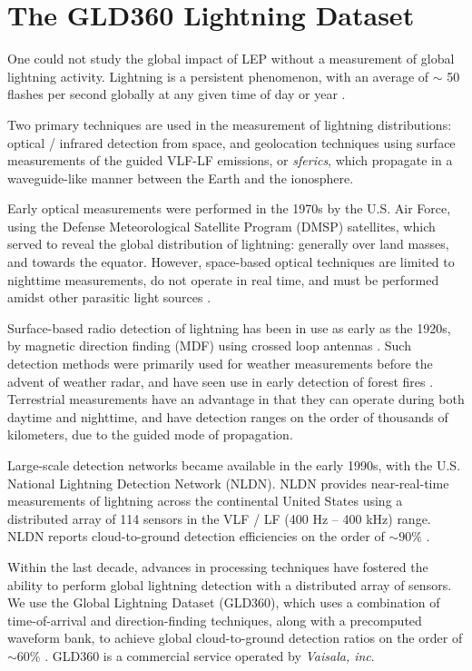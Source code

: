 \section{The GLD360 Lightning Dataset}
One could not study the global impact of LEP without a measurement of global lightning activity. Lightning is a persistent phenomenon, with an average of $\sim$ 50 flashes per second globally at any given time of day or year \citep{Brooks1925, Orville1979}.

Two primary techniques are used in the measurement of lightning distributions: optical / infrared detection from space, and geolocation techniques using surface measurements of the guided VLF-LF emissions, or \emph{sferics}, which propagate in a waveguide-like manner between the Earth and the ionosphere. 

Early optical measurements were performed in the 1970s by the U.S. Air Force, using the Defense Meteorological Satellite Program (DMSP) satellites, which served to reveal the global distribution of lightning: generally over land masses, and towards the equator. However, space-based optical techniques are limited to nighttime measurements, do not operate in real time, and must be performed amidst other parasitic light sources \citep{Orville1995}.

Surface-based radio detection of lightning has been in use as early as the 1920s, by magnetic direction finding (MDF) using crossed loop antennas \citep{Horner1954, Horner1957}. Such detection methods were primarily used for weather measurements before the advent of weather radar, and have seen use in early detection of forest fires \citep{Krider1980}. Terrestrial measurements have an advantage in that they can operate during both daytime and nighttime, and have detection ranges on the order of thousands of kilometers, due to the guided mode of propagation.

Large-scale detection networks became available in the early 1990s, with the U.S. National Lightning Detection Network (NLDN). NLDN provides near-real-time measurements of lightning across the continental United States using a distributed array of 114 sensors in the VLF / LF (400 Hz -- 400 kHz) range. NLDN reports cloud-to-ground detection efficiencies on the order of $\sim90\%$ \citep{Nag2011}. 

Within the last decade, advances in processing techniques have fostered the ability to perform global lightning detection with a distributed array of sensors. We use the Global Lightning Dataset (GLD360), which uses a combination of time-of-arrival and direction-finding techniques, along with a precomputed waveform bank, to achieve global cloud-to-ground detection ratios on the order of $\sim{60\%}$ \citep{Said2010a}. GLD360 is a commercial service operated by \emph{Vaisala, inc}.

